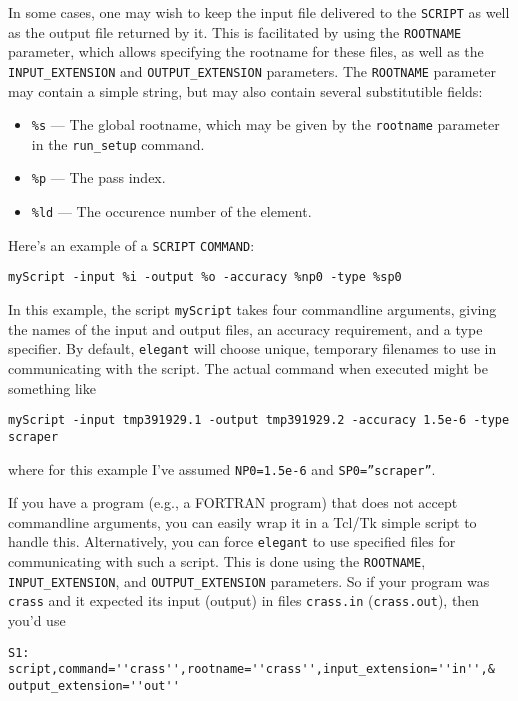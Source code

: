 In some cases, one may wish to keep the input file delivered to the \verb|SCRIPT| as
well as the output file returned by it. This is facilitated by using the \verb|ROOTNAME| 
parameter, which allows specifying the rootname for these files, as well as the
\verb|INPUT_EXTENSION| and \verb|OUTPUT_EXTENSION| parameters.
The \verb|ROOTNAME| parameter may contain a simple string, but may also contain several
substitutible  fields:
\begin{itemize}
\item \verb|%s| --- The global rootname, which may be given by the \verb|rootname| parameter
  in the \verb|run_setup| command.
\item \verb|%p| --- The pass index.
\item \verb|%ld| --- The occurence number of the element.
\end{itemize}

Here's an example of a {\tt SCRIPT} {\tt COMMAND}:
\begin{flushleft}
\begin{verbatim}
myScript -input %i -output %o -accuracy %np0 -type %sp0
\end{verbatim}
\end{flushleft}
In this example, the script {\tt myScript} takes four commandline arguments, giving
the names of the input and output files, an accuracy requirement, and a type specifier.
By default, {\tt elegant} will choose unique, temporary filenames to use in communicating
with the script.  The actual command when executed might be something like
\begin{flushleft}
\begin{verbatim}
myScript -input tmp391929.1 -output tmp391929.2 -accuracy 1.5e-6 -type scraper
\end{verbatim}
\end{flushleft}
where for this example I've assumed {\tt NP0=1.5e-6} and {\tt SP0=''scraper''}.

If you have a program (e.g., a FORTRAN program) that does not accept
commandline arguments, you can easily wrap it in a Tcl/Tk simple script to
handle this.  Alternatively, you can force {\tt elegant} to use specified 
files for communicating with such a script.  This is done using the {\tt ROOTNAME},
{\tt INPUT\_EXTENSION}, and {\tt OUTPUT\_EXTENSION} parameters.
So if your program was {\tt crass} and it expected its input (output) in files
{\tt crass.in} ({\tt crass.out}), then you'd use
\begin{flushleft}
\begin{verbatim}
S1: script,command=''crass'',rootname=''crass'',input_extension=''in'',&
output_extension=''out''
\end{verbatim}
\end{flushleft}

